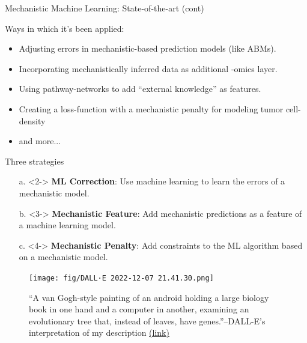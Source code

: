 \documentclass[10pt,aspectratio=169]{beamer}
\newcounter{frame}[frame]
\begin{document}
\begin{frame}{Mechanistic Machine Learning: State-of-the-art (cont)}

Ways in which it's been applied:

\begin{itemize}
    \item<2-> Adjusting errors in mechanistic-based prediction models (like ABMs).\autocite{compagniHybridNeuralNetworkSEIR2022}
    \item<3-> Incorporating mechanistically inferred data as additional -omics layer.\autocite{zampieriMachineDeepLearning2019}
    \item<4-> Using pathway-networks to add ``external knowledge'' as features.\autocite{altaweraqiImprovedPredictionGene2022}
    \item<5-> Creating a loss-function with a mechanistic penalty for modeling tumor cell-density\autocite{gawIntegrationMachineLearning2019}
    \item<6-> and more...\autocite{jornerMachineLearningMeets2021, willardIntegratingScientificKnowledge2022a, jiaPhysicsGuidedMachineLearning2021, vonruedenInformedMachineLearning2023}
\end{itemize}

\vfill
{}

    
\end{frame}

\begin{frame}{Three strategies}
	
	\begin{itemize}
	\item[a.]<2-> \textbf{ML Correction}: Use machine learning to learn the errors of a mechanistic model.
	\item[b.]<3-> \textbf{Mechanistic Feature}: Add mechanistic predictions as a feature of a machine learning model.
	\item[c.]<4-> \textbf{Mechanistic Penalty}: Add constraints to the ML algorithm based on a mechanistic model.
	\end{itemize}

	\begin{figure}
	\centering
	\texttt{[image: fig/DALL·E 2022-12-07 21.41.30.png]}
	\caption{``A van Gogh-style painting of an android holding a large biology book in one hand and a computer in another, examining an evolutionary tree that, instead of leaves, have genes.''--DALL-E's interpretation of my description \hyperlink{https://labs.openai.com/s/s0GoDQ64OMRfMr1y6uRXtmo9}{(link)}}
\end{figure}
\end{frame}
\end{document}
